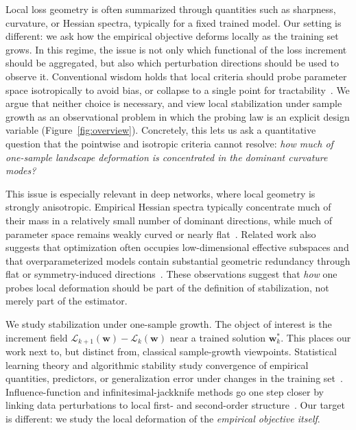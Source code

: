 \documentclass{article}
\begin{document}
Local loss geometry is often summarized through quantities such as sharpness, curvature, or Hessian spectra, typically for a fixed trained model. Our setting is different: we ask how the empirical objective deforms locally as the training set grows. In this regime, the issue is not only which functional of the loss increment should be aggregated, but also which perturbation directions should be used to observe it. Conventional wisdom holds that local criteria should probe parameter space isotropically to avoid bias, or collapse to a single point for tractability~\citep{kiselev2024unraveling}. We argue that neither choice is necessary, and view local stabilization under sample growth as an observational problem in which the probing law is an explicit design variable (Figure~\ref{fig:overview}). Concretely, this lets us ask a quantitative question that the pointwise and isotropic criteria cannot resolve: \emph{how much of one-sample landscape deformation is concentrated in the dominant curvature modes?}

This issue is especially relevant in deep networks, where local geometry is strongly anisotropic. Empirical Hessian spectra typically concentrate much of their mass in a relatively small number of dominant directions, while much of parameter space remains weakly curved or nearly flat~\citep{li2018visualizing,sagun2017hessian,ghorbani2019investigation,papyan2019fullspectrum,xu2024mining}. Related work also suggests that optimization often occupies low-dimensional effective subspaces and that overparameterized models contain substantial geometric redundancy through flat or symmetry-induced directions~\citep{gurari2018tiny,li2018intrinsic,simsek2021geometry,draxler2018essentially,garipov2018mode}. These observations suggest that \emph{how} one probes local deformation should be part of the definition of stabilization, not merely part of the estimator.

We study stabilization under one-sample growth. The object of interest is the increment field $\mathcal L_{k+1}(\mathbf w)-\mathcal L_k(\mathbf w)$ near a trained solution $\mathbf w_k^*$. This places our work next to, but distinct from, classical sample-growth viewpoints. Statistical learning theory and algorithmic stability study convergence of empirical quantities, predictors, or generalization error under changes in the training set~\citep{vapnik1998statistical,shalev2014understanding,bousquet2002stability,hardt2016train,bousquet2020sharper}. Influence-function and infinitesimal-jackknife methods go one step closer by linking data perturbations to local first- and second-order structure~\citep{koh2017influence,giordano2019swiss,koh2019group,basu2020secondorder}. Our target is different: we study the local deformation of the \emph{empirical objective itself}.
\end{document}
